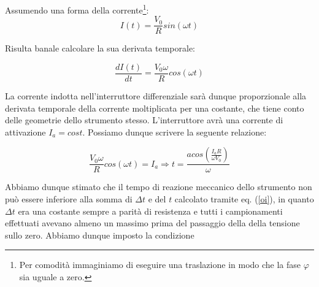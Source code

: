 Assumendo una forma della corrente\footnote{Per comodità immaginiamo di eseguire una traslazione in modo che la fase $\varphi$ sia uguale a zero.}:
\begin{equation}
I(t)=\frac{V_0}{R}sin(\omega t)
\label{corrente}
\end{equation}

Risulta banale calcolare la sua derivata temporale:

\begin{equation}
\frac{dI(t)}{dt}=\frac{V_0 \omega}{R}cos(\omega t)
\end{equation}

La corrente indotta nell'interruttore differenziale sarà dunque proporzionale alla derivata temporale della corrente moltiplicata per una costante, che tiene conto delle geometrie dello strumento stesso. L'interruttore avrà una corrente di attivazione $I_a=cost$. Possiamo dunque scrivere la seguente relazione:

\begin{equation}
\frac{V_0 \omega}{R}cos(\omega t)=I_a \Rightarrow t=\frac{acos(\frac{I_a R}{\omega V_0})}{\omega }
\label{oi}
\end{equation} 

Abbiamo dunque stimato che il tempo di reazione meccanico dello strumento non può essere inferiore alla somma di $\Delta t$ e del $t$ calcolato tramite eq. (\ref{oi}), in quanto $\Delta t$ era una costante sempre a parità di resistenza e tutti i campionamenti effettuati avevano almeno un massimo prima del passaggio della della tensione sullo zero. Abbiamo dunque imposto la condizione 
